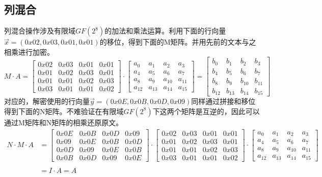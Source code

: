 \documentclass[UTF8]{ctexart}
\begin{document}
\subsection{列混合}
列混合操作涉及有限域$GF(2^8)$的加法和乘法运算。利用下面的行向量$\vec{x}=(0x02,0x03,0x01,0x01)$的移位，得到下面的M矩阵。并用先前的文本与之相乘进行加密。
\begin{equation}
M \cdot A =
\begin{bmatrix}
  0x02& 0x03& 0x01& 0x01\\
  0x01& 0x02& 0x03& 0x01\\
  0x01& 0x01& 0x02& 0x03\\
  0x03& 0x01& 0x01& 0x02
\end{bmatrix}
\cdot 
\begin{bmatrix}
  a_{0} & a_{1} & a_{2} & a_{3} \\
  a_{4} & a_{5} & a_{6} & a_{7} \\
  a_{8} & a_{9} & a_{10}& a_{11} \\
  a_{12}& a_{13}& a_{14}& a_{15}
\end{bmatrix}
=
\begin{bmatrix}
  b_{0} & b_{1} & b_{2} & b_{3} \\
  b_{4} & b_{5} & b_{6} & b_{7} \\
  b_{8} & b_{9} & b_{10}& b_{11} \\
  b_{12}& b_{13}& b_{14}& b_{15}
\end{bmatrix}
\end{equation}
对应的，解密使用的行向量$\vec{y}=(0x0E,0x0B,0x0D,0x09)$同样通过拼接和移位得到下面的N矩阵。不难验证在有限域$GF(2^8)$下这两个矩阵是互逆的，因此可以通过M矩阵和N矩阵的相乘还原原文。
\begin{equation}
\begin{aligned}
N \cdot M \cdot A &= 
\begin{bmatrix}
  0x0E& 0x0B& 0x0D& 0x09\\
  0x09& 0x0E& 0x0B& 0x0D\\
  0x0D& 0x09& 0x0E& 0x0B\\
  0x0B& 0x0D& 0x09& 0x0E
\end{bmatrix}
\cdot
\begin{bmatrix}
  0x02& 0x03& 0x01& 0x01\\
  0x01& 0x02& 0x03& 0x01\\
  0x01& 0x01& 0x02& 0x03\\
  0x03& 0x01& 0x01& 0x02
\end{bmatrix}
\cdot 
\begin{bmatrix}
  a_{0} & a_{1} & a_{2} & a_{3} \\
  a_{4} & a_{5} & a_{6} & a_{7} \\
  a_{8} & a_{9} & a_{10}& a_{11} \\
  a_{12}& a_{13}& a_{14}& a_{15}
\end{bmatrix} 
\\
\\
&=I \cdot A = A
\end{aligned}
\end{equation}
\end{document}

